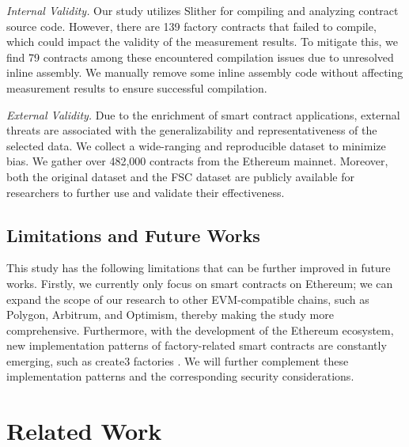 \documentclass[acmsmall,screen]{acmart}
\begin{document}
	\textit{Internal Validity.} Our study utilizes Slither for compiling and analyzing contract source code. However, there are 139 factory contracts that failed to compile, which could impact the validity of the measurement results. To mitigate this, we find 79 contracts among these encountered compilation issues due to unresolved inline assembly. We manually remove some inline assembly code without affecting measurement results to ensure successful compilation.

	\textit{External Validity.} Due to the enrichment of smart contract applications, external threats are associated with the generalizability and representativeness of the selected data. We collect a wide-ranging and reproducible dataset to minimize bias. We gather over 482,000 contracts from the Ethereum mainnet. Moreover, both the original dataset and the FSC dataset are publicly available for researchers to further use and validate their effectiveness.

	\subsection{Limitations and Future Works}
	This study has the following limitations that can be further improved in future works. Firstly, we currently only focus on smart contracts on Ethereum; we can expand the scope of our research to other EVM-compatible chains, such as Polygon, Arbitrum, and Optimism, thereby making the study more comprehensive. Furthermore, with the development of the Ethereum ecosystem, new implementation patterns of factory-related smart contracts are constantly emerging, such as create3 factories \cite{eip-3171}. We will further complement these implementation patterns and the corresponding security considerations.

	\section{Related Work}\label{sec:relatedwork}
\end{document}
